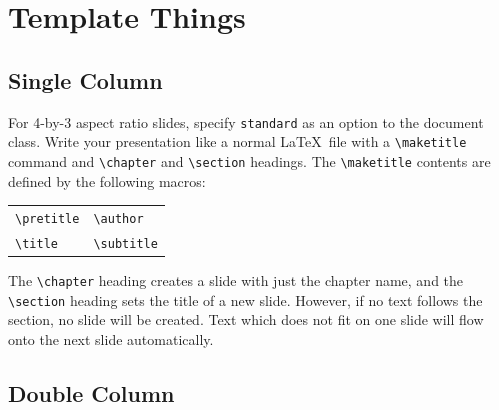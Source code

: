 \documentclass{antclass}
\begin{document}
\chapter{Template Things}
\section{Single Column}

For 4-by-3 aspect ratio slides, specify \verb|standard| as an option to the
document class. Write your presentation like a normal \LaTeX\ file with a
\verb|\maketitle| command and \verb|\chapter| and \verb|\section| headings. The
\verb|\maketitle| contents are defined by the following macros:
\begin{center}
    \begin{tabular}{l@{\qquad}l}
        \verb|\pretitle| &
        \verb|\author| \\
        \verb|\title| &
        \verb|\subtitle|
    \end{tabular}
\end{center}
The \verb|\chapter| heading creates a slide with just the chapter name, and the
\verb|\section| heading sets the title of a new slide. However, if no text
follows the section, no slide will be created. Text which does not fit on one
slide will flow onto the next slide automatically.

\section{Double Column}\twocolumn\raggedright
\end{document}
